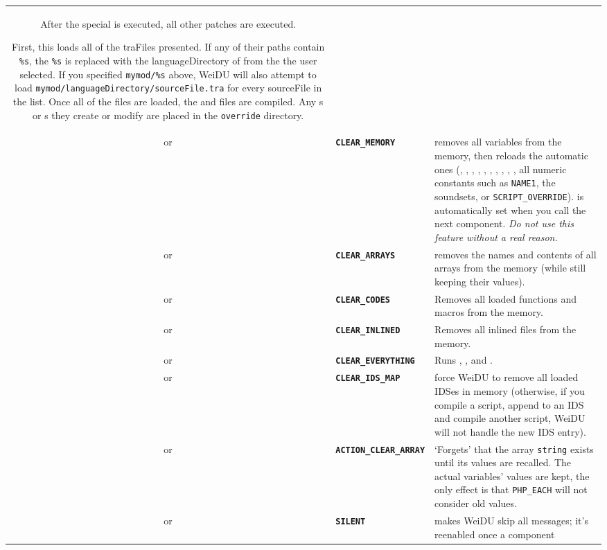 \documentclass{article}
\def\ttref#1{\ahrefloc{#1}{\tt #1}}
\def\DEFINE#1{{\tt \bf #1}\label{#1}\index{#1}}
\def\t#1{{\tt #1}}
\begin{document}
\begin{tabular}{cp{10in}|p{10in}}
      After the special \ttref{EVALUATE_BUFFER} is executed, all other patches are executed.


      First, this loads all of the traFiles presented. If any of their
      paths contain \t{\%s}, the \t{\%s} is replaced with the
      languageDirectory of from the  \ttref{Language} the user selected.
      If you specified \ttref{AUTO_TRA} \t{mymod/\%s} above, WeiDU will
      also attempt to load \t{mymod/languageDirectory/sourceFile.tra} for
      every sourceFile in the list. Once all of the \ttref{TRA} files are
      loaded, the \ttref{D} and \ttref{BAF} files are compiled. Any
      \ttref{DLG}s or \ttref{BCS}s they create or modify are placed in the
      \t{override} directory.  \\
  or & \DEFINE{CLEAR_MEMORY} & removes all variables from the memory,
      then reloads the automatic ones (\ttref{TP2_AUTHOR},
      \ttref{TP2_FILE_NAME}, \ttref{TP2_BASE_NAME}, \ttref{MOD_FOLDER},
      \ttref{LANGUAGE}, \ttref{WEIDU_VER}, \ttref{WEIDU_ARCH},
      \ttref{WEIDU_OS}, \ttref{WEIDU_EXECUTABLE}, \ttref{COMPONENT_NUMBER},
      all numeric constants such as \t{NAME1}, the soundsets, or
      \t{SCRIPT_OVERRIDE}). \ttref{INTERACTIVE} is automatically set when
      you call the next component. \emph{Do not use this feature without a
      real reason.} \\
  or & \DEFINE{CLEAR_ARRAYS} & removes the names and contents of all arrays
      from the memory (while still keeping their values). \\
  or & \DEFINE{CLEAR_CODES} & Removes all loaded functions and macros from the
      memory. \\
  or & \DEFINE{CLEAR_INLINED} & Removes all inlined files from the memory. \\
  or & \DEFINE{CLEAR_EVERYTHING} & Runs \ttref{CLEAR_MEMORY}, \ttref{CLEAR_ARRAY}, \ttref{CLEAR_CODES} and
      \ttref{CLEAR_INLINED}. \\
  or & \DEFINE{CLEAR_IDS_MAP} & force WeiDU to remove all loaded IDSes in memory
      (otherwise, if you compile a script, append to an IDS and compile another script, WeiDU
      will not handle the new IDS entry). \\
  or & \DEFINE{ACTION_CLEAR_ARRAY} \ttref{String} &
    `Forgets' that the array \t{string} exists until its values are recalled.
    The actual variables' values are kept, the only effect is that \t{*PHP_EACH}
    will not consider old values.
  \\
  or & \DEFINE{SILENT} & makes WeiDU skip all messages; it's reenabled once a component

\end{tabular}
\end{document}

